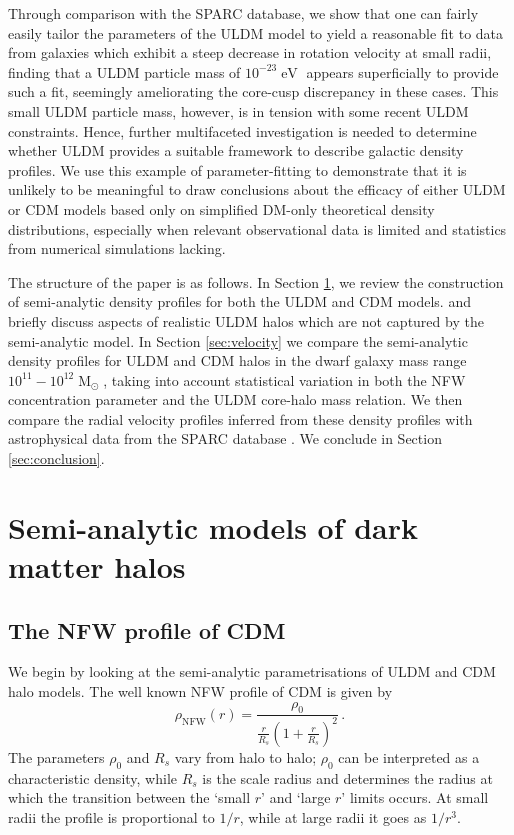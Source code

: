 \documentclass{pasa}%
\begin{document}
Through comparison with the SPARC database, we show that one can fairly easily tailor the parameters of the ULDM model to yield a reasonable fit to data from galaxies which exhibit a steep decrease in rotation velocity at small radii, finding that a ULDM particle mass of $10^{-23}\operatorname{eV}$ appears superficially to provide such a fit, seemingly ameliorating the core-cusp discrepancy in these cases. This small ULDM particle mass, however, is in tension with some recent ULDM constraints. Hence, further multifaceted investigation is needed to determine whether ULDM provides a suitable framework to describe galactic density profiles. We use this example of parameter-fitting to demonstrate that it is unlikely to be meaningful to draw conclusions about the efficacy of either ULDM or CDM models based only on simplified DM-only theoretical density distributions, especially when relevant observational data is limited and statistics from numerical simulations lacking. 

The structure of the paper is as follows. In Section \ref{sec:models}, we review the construction of semi-analytic density profiles for both the ULDM and CDM models. and briefly discuss aspects of realistic ULDM halos which are not captured by the semi-analytic model. In Section \ref{sec:velocity} we compare the semi-analytic density profiles for ULDM and CDM halos in the dwarf galaxy mass range $10^{11} - 10^{12}\operatorname{M}_{\odot}$, taking into account statistical variation in both the NFW concentration parameter and the ULDM core-halo mass relation. We then compare the radial velocity profiles inferred from these density profiles with astrophysical data from the SPARC database \cite{Lelli:2016zqa}. We conclude in Section \ref{sec:conclusion}.

 
\section{Semi-analytic models of dark matter halos}\label{sec:models}


\subsection{The NFW profile of CDM}\label{sec:NFW}

We begin by looking at the semi-analytic parametrisations of ULDM and CDM halo models. The  well known  NFW   profile of CDM \cite{Navarro:1995iw, Maccio:2008pcd}  is given by
%
\begin{equation}\label{eq:nfw}
    \rho_\mathrm{NFW}(r)=\frac{\rho_0}{\frac{r}{R_s}\left(1+\frac{r}{R_s}\right)^2} \, .
\end{equation}
%
The parameters $\rho_0$ and $R_s$ vary from halo to halo; $\rho_0$ can be interpreted as a characteristic density, while $R_s$ is the scale radius and determines the radius at which the transition between the `small $r$' and `large $r$' limits occurs. At small radii the profile is proportional to $1/r$, while at large radii it goes as $1/r^3$.
\end{document}
